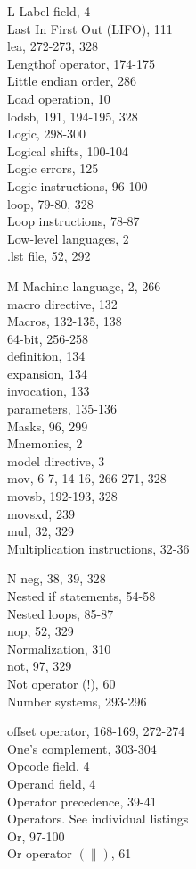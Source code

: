 \documentclass[10pt]{book}
\begin{document}
L
Label field, 4\\

Last In First Out (LIFO), 111\\
lea, 272-273, 328\\
Lengthof operator, 174-175\\
Little endian order, 286\\
Load operation, 10\\
lodsb, 191, 194-195, 328\\
Logic, 298-300\\
Logical shifts, 100-104\\
Logic errors, 125\\
Logic instructions, 96-100\\
loop, 79-80, 328\\
Loop instructions, 78-87\\
Low-level languages, 2\\
.lst file, 52, 292

M
Machine language, 2, 266\\
macro directive, 132\\
Macros, 132-135, 138\\
64-bit, 256-258\\
definition, 134\\
expansion, 134\\
invocation, 133\\
parameters, 135-136\\
Masks, 96, 299\\
Mnemonics, 2\\
model directive, 3\\
mov, 6-7, 14-16, 266-271, 328\\
movsb, 192-193, 328\\
movsxd, 239\\
mul, 32, 329\\
Multiplication instructions, 32-36

N
neg, 38, 39, 328\\
Nested if statements, 54-58\\
Nested loops, 85-87\\
nop, 52, 329\\
Normalization, 310\\
not, 97, 329\\
Not operator (!), 60\\
Number systems, 293-296


offset operator, 168-169, 272-274\\
One's complement, 303-304\\
Opcode field, 4\\
Operand field, 4\\
Operator precedence, 39-41\\
Operators. See individual listings\\
Or, 97-100\\
Or operator $(\|)$, 61
\end{document}
